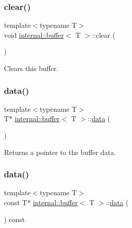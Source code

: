 \subsubsection{\texorpdfstring{clear()}{clear()}}
{\footnotesize\ttfamily template$<$typename T$>$ \\
void \hyperlink{classinternal_1_1buffer}{internal\+::buffer}$<$ T $>$\+::clear (\begin{DoxyParamCaption}{ }\end{DoxyParamCaption})\hspace{0.3cm}{\ttfamily [inline]}}

Clears this buffer. \mbox{\label{classinternal_1_1buffer_aaaa371bd0a7aaad4af49363cb85fefb3}} 
\subsubsection{\texorpdfstring{data()}{data()}\hspace{0.1cm}{\footnotesize\ttfamily [1/2]}}
{\footnotesize\ttfamily template$<$typename T$>$ \\
T$\ast$ \hyperlink{classinternal_1_1buffer}{internal\+::buffer}$<$ T $>$\+::\hyperlink{structinternal_1_1data}{data} (\begin{DoxyParamCaption}{ }\end{DoxyParamCaption})\hspace{0.3cm}{\ttfamily [inline]}}

Returns a pointer to the buffer data. \mbox{\label{classinternal_1_1buffer_a7ad3b2ff77f2b5ca94c45b9c17901212}} 
\subsubsection{\texorpdfstring{data()}{data()}\hspace{0.1cm}{\footnotesize\ttfamily [2/2]}}
{\footnotesize\ttfamily template$<$typename T$>$ \\
const T$\ast$ \hyperlink{classinternal_1_1buffer}{internal\+::buffer}$<$ T $>$\+::\hyperlink{structinternal_1_1data}{data} (\begin{DoxyParamCaption}{ }\end{DoxyParamCaption}) const\hspace{0.3cm}{\ttfamily [inline]}}

